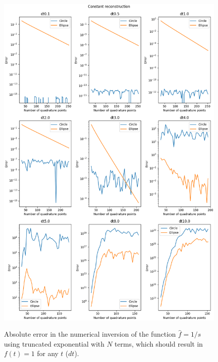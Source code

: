 \documentclass[10pt,a4paper,final]{article}
\begin{document}
\begin{figure}[h!]
\centering
\includegraphics[scale=0.5]{const_recon_truncN}
\label{fig:const_truncN}
\caption{Absolute error in the numerical inversion of the function $\widehat{f}=1/s$ using truncated exponential with $N$ terms, which should result in $f(t)=1$ for any $t$ ($dt$). }
\end{figure}
\end{document}
